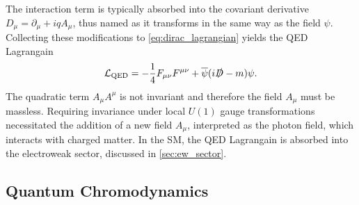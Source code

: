The interaction term is typically absorbed into the covariant derivative $D_\mu = \partial_\mu + i q A_\mu$, thus named as it transforms in the same way as the field $\psi$.
Collecting these modifications to \cref{eq:dirac_lagrangian} yields the QED Lagrangain
%
\begin{equation}\label{eq:qed_lagrangian}
  \mathcal{L}_{\textnormal{QED}} = -\frac{1}{4} F_{\mu\nu} F^{\mu\nu} + \overline{\psi} (i \slashed{D} - m )\psi .
\end{equation}
%
The quadratic term $A_\mu A^\mu$ is not invariant and therefore the field $A_\mu$ must be massless.
Requiring invariance under local $U(1)$ gauge transformations necessitated the addition of a new field $A_\mu$, interpreted as the photon field, which interacts with charged matter.
In the SM, the QED Lagrangain is absorbed into the electroweak sector, discussed in \cref{sec:ew_sector}.


\subsection{Quantum Chromodynamics}\label{sec:qcd}

